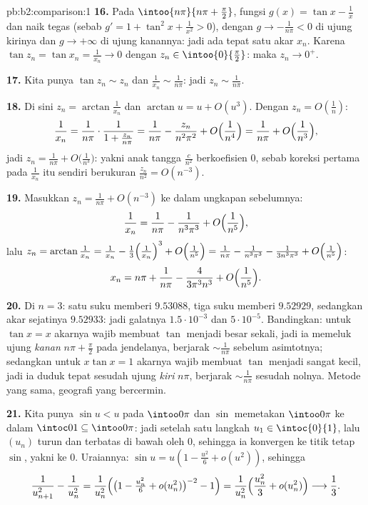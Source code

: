 \begin{solution}{pb:b2:comparison:1}
\textbf{16.} Pada $\intoo{n\pi}{n\pi + \frac\pi2}$, fungsi $g(x) = \tan
x - \frac1x$  dan naik tegas (sebab $g' = 1 +
\tan^2x + \frac1{x^2} > 0$), dengan $g \to -\frac1{n\pi} < 0$ di
ujung kirinya dan $g \to +\infty$ di ujung kanannya: jadi ada tepat satu
akar $x_n$. Karena $\tan z_n = \tan x_n = \frac1{x_n} \to 0$
dengan $z_n \in \intoo{0}{\frac\pi2}$: maka $z_n \to 0^+$.

\textbf{17.} Kita punya $\tan z_n \sim z_n$ dan $\frac1{x_n} \sim
\frac1{n\pi}$: jadi $z_n \sim \frac1{n\pi}$.

\textbf{18.} Di sini $z_n = \arctan\frac1{x_n}$ dan $\arctan u = u +
O(u^3)$. Dengan $z_n = O(\frac1n)$:
\[
\frac1{x_n} = \frac{1}{n\pi}\cdot\frac1{1 + \frac{z_n}{n\pi}}
= \frac1{n\pi} - \frac{z_n}{n^2\pi^2} +
O\Bigl(\frac1{n^4}\Bigr)
= \frac1{n\pi} + O\Bigl(\frac1{n^3}\Bigr),
\]
jadi $z_n = \frac1{n\pi} + O\bigl(\frac1{n^3}\bigr)$: yakni anak tangga
$\frac{c}{n^2}$ berkoefisien $0$, sebab koreksi pertama pada
$\frac1{x_n}$ itu sendiri berukuran $\frac{z_n}{n^2} = O(n^{-3})$.

\textbf{19.} Masukkan $z_n = \frac1{n\pi} + O(n^{-3})$ ke dalam
ungkapan sebelumnya:
\[
\frac{1}{x_n} = \frac{1}{n\pi} - \frac{1}{n^3\pi^3} +
O\Bigl(\frac1{n^5}\Bigr),
\]
lalu $z_n = \arctan\frac1{x_n} = \frac1{x_n} -
\frac{1}{3}\Bigl(\frac1{x_n}\Bigr)^3 + O\Bigl(\frac1{n^5}\Bigr)
= \frac1{n\pi} - \frac{1}{n^3\pi^3} - \frac{1}{3n^3\pi^3} +
O\Bigl(\frac1{n^5}\Bigr)$:
\[
x_n = n\pi + \frac{1}{n\pi} - \frac{4}{3\pi^3n^3} +
O\Bigl(\frac1{n^5}\Bigr).
\]

\textbf{20.} Di $n = 3$: satu suku memberi $9.53088$, tiga suku
memberi $9.52929$, sedangkan akar sejatinya $9.52933$: jadi galatnya
$1.5\cdot10^{-3}$ dan $5\cdot10^{-5}$. Bandingkan: untuk $\tan x = x$
akarnya wajib membuat $\tan$ menjadi besar sekali, jadi ia memeluk ujung
\emph{kanan} $n\pi + \frac\pi2$ pada jendelanya, berjarak
$\sim\frac1{n\pi}$ sebelum asimtotnya; sedangkan untuk $x\tan x = 1$
akarnya wajib membuat $\tan$ menjadi sangat kecil, jadi ia duduk tepat
sesudah ujung \emph{kiri} $n\pi$, berjarak $\sim\frac1{n\pi}$ sesudah
nolnya. Metode yang sama, geografi yang bercermin.

\textbf{21.} Kita punya $\sin u < u$ pada $\intoo0\pi$ dan $\sin$
memetakan $\intoo0\pi$ ke dalam $\intoc01 \subseteq \intoo0\pi$: jadi
setelah satu langkah $u_1 \in \intoc{0}{1}$, lalu $(u_n)$ turun dan
terbatas di bawah oleh $0$, sehingga ia konvergen ke titik tetap $\sin$,
yakni ke $0$. Uraiannya: $\sin u = u(1 - \frac{u^2}6 +
o(u^2))$, sehingga
\[
\frac{1}{u_{n+1}^2} - \frac1{u_n^2}
= \frac{1}{u_n^2}\Bigl(\bigl(1 - \tfrac{u_n^2}6 +
o(u_n^2)\bigr)^{-2} - 1\Bigr)
= \frac{1}{u_n^2}\Bigl(\frac{u_n^2}{3} + o(u_n^2)\Bigr)
\longrightarrow \frac13 .
\]


\end{solution}
